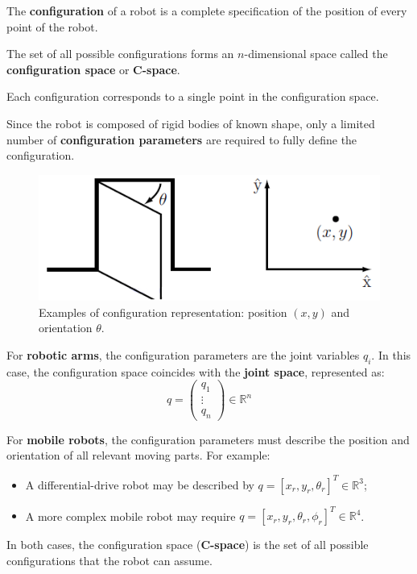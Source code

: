 The \textbf{configuration} of a robot is a complete specification of the position of every point of the robot.

The set of all possible configurations forms an $n$-dimensional space called the \textbf{configuration space} or \textbf{C-space}.

Each configuration corresponds to a single point in the configuration space.

Since the robot is composed of rigid bodies of known shape, only a limited number of \textbf{configuration parameters} are required to fully define the configuration.

\begin{figure}[H]
  \centering
  \includegraphics[width=0.55\linewidth]{imgs/configuration_space.png}
  \caption{Examples of configuration representation: position $(x, y)$ and orientation $\theta$.}
\end{figure}

For \textbf{robotic arms}, the configuration parameters are the joint variables $q_i$. In this case, the configuration space coincides with the \textbf{joint space}, represented as:
\[
q = 
\begin{pmatrix}
q_1 \\
\vdots \\
q_n
\end{pmatrix}
\in \mathbb{R}^n
\]

For \textbf{mobile robots}, the configuration parameters must describe the position and orientation of all relevant moving parts. For example:
\begin{itemize}
  \item A differential-drive robot may be described by $q = [x_r, y_r, \theta_r]^T \in \mathbb{R}^3$;
  \item A more complex mobile robot may require $q = [x_r, y_r, \theta_r, \phi_r]^T \in \mathbb{R}^4$.
\end{itemize}

In both cases, the configuration space (\textbf{C-space}) is the set of all possible configurations that the robot can assume.

